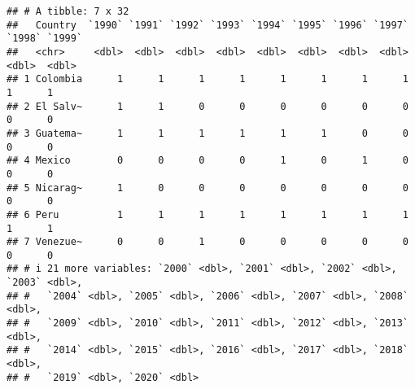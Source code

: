 \documentclass[
  11pt,
]{article}
\newenvironment{Shaded}{\begin{snugshade}}{\end{snugshade}}
\newcommand{\AttributeTok}[1]{\textcolor[rgb]{0.13,0.29,0.53}{#1}}
\newcommand{\DecValTok}[1]{\textcolor[rgb]{0.00,0.00,0.81}{#1}}
\newcommand{\FunctionTok}[1]{\textcolor[rgb]{0.13,0.29,0.53}{\textbf{#1}}}
\newcommand{\NormalTok}[1]{#1}
\newcommand{\OtherTok}[1]{\textcolor[rgb]{0.56,0.35,0.01}{#1}}
\newcommand{\SpecialCharTok}[1]{\textcolor[rgb]{0.81,0.36,0.00}{\textbf{#1}}}
\newcommand{\StringTok}[1]{\textcolor[rgb]{0.31,0.60,0.02}{#1}}
\begin{document}
\begin{Shaded}
\end{Shaded}

\begin{verbatim}
## # A tibble: 7 x 32
##   Country  `1990` `1991` `1992` `1993` `1994` `1995` `1996` `1997` `1998` `1999`
##   <chr>     <dbl>  <dbl>  <dbl>  <dbl>  <dbl>  <dbl>  <dbl>  <dbl>  <dbl>  <dbl>
## 1 Colombia      1      1      1      1      1      1      1      1      1      1
## 2 El Salv~      1      1      0      0      0      0      0      0      0      0
## 3 Guatema~      1      1      1      1      1      1      0      0      0      0
## 4 Mexico        0      0      0      0      1      0      1      0      0      0
## 5 Nicarag~      1      0      0      0      0      0      0      0      0      0
## 6 Peru          1      1      1      1      1      1      1      1      1      1
## 7 Venezue~      0      0      1      0      0      0      0      0      0      0
## # i 21 more variables: `2000` <dbl>, `2001` <dbl>, `2002` <dbl>, `2003` <dbl>,
## #   `2004` <dbl>, `2005` <dbl>, `2006` <dbl>, `2007` <dbl>, `2008` <dbl>,
## #   `2009` <dbl>, `2010` <dbl>, `2011` <dbl>, `2012` <dbl>, `2013` <dbl>,
## #   `2014` <dbl>, `2015` <dbl>, `2016` <dbl>, `2017` <dbl>, `2018` <dbl>,
## #   `2019` <dbl>, `2020` <dbl>
\end{verbatim}
\end{document}
